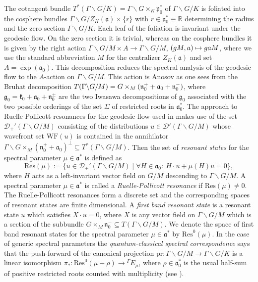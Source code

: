 \documentclass[JEP,XML,SOM,NoFloatCountersInSection,Unicode,published]{cedram}
\newcommand\mto{\mathchoice{\longmapsto}{\mapsto}{\mapsto}{\mapsto}}
\newcommand{\Ga}{{}^\Gamma\!}
\theoremstyle{definition}
\begin{document}
The cotangent bundle $T^*(\Gamma\backslash G/K)=\Gamma\backslash G\times_K\mathfrak p_0^*$ of $\Gamma\backslash G/K$ is foliated into the cosphere bundles $\Gamma\backslash G/Z_K(\mathfrak a)\times \{r\}$ with $r\in \mathfrak a_0^*\equiv \mathbb R$ determining the radius and the zero section $\Gamma\backslash G/K$. Each leaf of the foliation is invariant under the geodesic flow. On the zero section it is trivial, whereas on the cosphere bundles it is given by the right action $\Gamma\backslash G/M\times A\to \Gamma\backslash G/M$, $(gM,a)\mto gaM$, where we use the standard abbreviation $M$ for the centralizer $Z_K(\mathfrak a)$ and set $A=\exp(\mathfrak a_0)$. This decomposition reduces the spectral analysis of the geodesic flow to the $A$-action on $\Gamma\backslash G/M$. This action is Anosov as one sees from the Bruhat decomposition $T(\Gamma\backslash G/M)=G\times_M\nobreak(\mathfrak n_0^++\nobreak\mathfrak a_0+\nobreak\mathfrak n_0^-)$, where $\mathfrak g_0=\mathfrak k_0+\mathfrak a_0+\mathfrak n_0^\pm$ are the two Iwasawa decompositions of $\mathfrak g_0$ associated with the two possible orderings of the set $\Sigma$ of restricted roots in $\mathfrak a_0^*$. The approach to Ruelle-Pollicott resonances for the geodesic flow used in \cite{GHWb} makes use of the set $\mathcal D_+'(\Gamma\backslash G/M)$ consisting of the distributions $u\in \mathcal D'(\Gamma\backslash G/M)$ whose wavefront set $\mathrm{WF}(u)$ is contained in the annihilator $\Gamma\backslash G\times_M (\mathfrak n_0^++\mathfrak a_0)^\perp\subseteq T^*(\Gamma\backslash G/M)$. Then the set of \emph{resonant states} for the spectral parameter $\mu\in\mathfrak a^*$ is defined as\vspace*{-3pt}
\[
\mathrm{Res}(\mu):= \{u\in \mathcal D_+'(\Gamma\backslash G/M)\mid \forall H\in\mathfrak a_0:\ H\cdot u+ \mu(H)u=0\},
\]
where $H$ acts as a left-invariant vector field on $G/M$ descending to $\Gamma\backslash G/M$. A spectral parameter $\mu\in\mathfrak a^*$ is called a \emph{Ruelle-Pollicott resonance} if $\mathrm{Res}(\mu)\not=0$. The Ruelle-Pollicott resonances form a discrete set and the corresponding spaces of resonant states are finite dimensional. A \emph{first band resonant state} is a resonant state $u$ which satisfies $X\cdot u =0$, where $X$ is any vector field on $\Gamma\backslash G/M$ which is a section of the subbundle $G\times_M \mathfrak n_0^-\subseteq T(\Gamma\backslash G/M)$. We denote the space of first band resonant states for the spectral parameter $\mu\in\mathfrak a^*$ by $\mathrm{Res}^0(\mu)$. In the case of generic spectral parameters the \emph{quantum-classical spectral correspondence} says that the push-forward of the canonical projection $\mathrm{pr}: \Gamma\backslash G/M\to \Gamma\backslash G/K$ is a linear isomorphism $\pi_*: \mathrm{Res}^0(\mu-\rho) \to {}\Ga E_\mu$, where $\rho\in\mathfrak a_0^*$ is the usual half-sum of positive restricted roots counted with multiplicity (see \cite[Th.\,4.5]{GHWb}).
\end{document}
